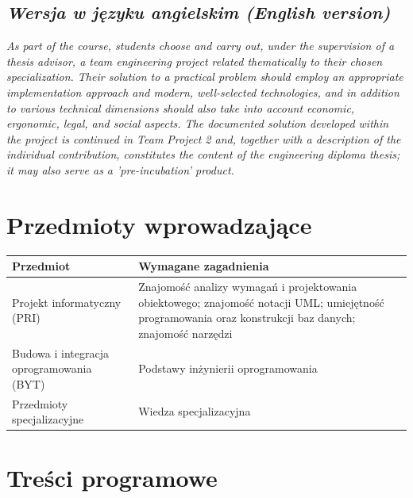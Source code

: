 \documentclass[12pt, a4paper]{article}
\newcommand{\thdrule}{\noalign{\global\setlength{\extrarowheight}{0pt}}}
\newcommand{\thdend}{\noalign{\global\setlength{\extrarowheight}{3pt}}}
\begin{document}
\subsection*{\textit{Wersja w języku angielskim (English version)}}

\textit{As part of the course, students choose and carry out, under the supervision of a thesis advisor, a team engineering project related thematically to their chosen specialization. Their solution to a practical problem should employ an appropriate implementation approach and modern, well-selected technologies, and in addition to various technical dimensions should also take into account economic, ergonomic, legal, and social aspects. The documented solution developed within the project is continued in Team Project 2 and, together with a description of the individual contribution, constitutes the content of the engineering diploma thesis; it may also serve as a 'pre-incubation' product.}


\section{Przedmioty wprowadzające}

{\scriptsize
\begin{tabularx}{\textwidth}{m{5cm}Y}
\thdrule\toprule
{} {\color{white}\textbf{Przedmiot}} & {\color{white}\textbf{Wymagane zagadnienia}} \\
\midrule\thdend
   Projekt informatyczny (PRI) & Znajomość analizy wymagań i projektowania obiektowego; znajomość notacji UML; umiejętność programowania oraz konstrukcji baz danych; znajomość narzędzi \\
   Budowa i integracja oprogramowania (BYT) & Podstawy inżynierii oprogramowania \\
   Przedmioty specjalizacyjne & Wiedza specjalizacyjna \\
\bottomrule
\end{tabularx}}

\section{Treści programowe}
\end{document}
